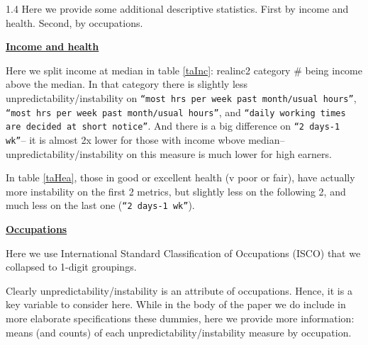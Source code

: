 \documentclass[10pt, letterpaper]{article}
\begin{document}
\begin{spacing}{1.4}
Here we provide some additional descriptive statistics. First by income and
health. Second, by occupations. 

{\underline \bf Income and health}

Here we split income at median in table \ref{taInc}: realinc2 category \# being
income above the median. In that category there is slightly less
unpredictability/instability on \texttt{``most hrs per week past month/usual
  hours''}, \texttt{``most hrs per week past month/usual hours''}, and
\texttt{``daily working times are decided at short notice''}. And there is a big
difference on  \texttt{``2 days-1 wk''}-- it is almost 2x lower for those with
income wbove median--unpredictability/instability on this measure is much lower
for high earners. 


In table \ref{taHea}, those in good or excellent health (v poor or fair), have
actually more instability on the first 2 metrics, but slightly less on the following
2, and much less on the last one (\texttt{``2 days-1 wk''}). 

\begin{table}[H]\centering   \begin{scriptsize}
 
\end{scriptsize}\caption{\label{taInc}}\end{table}

\begin{table}[H]\centering   \begin{scriptsize}
 
\end{scriptsize}\caption{\label{taHea}}\end{table}

%  


{\underline \bf Occupations}

Here we use International Standard Classification of Occupations (ISCO) that we
collapsed to 1-digit groupings. 

Clearly unpredictability/instability is an attribute of occupations. Hence, it
is a key variable to consider here. While in the body of the paper we do
include in more elaborate specifications these dummies, here we provide more
information:  means (and counts) of each unpredictability/instability measure by occupation. 


\end{spacing}
\end{document}
